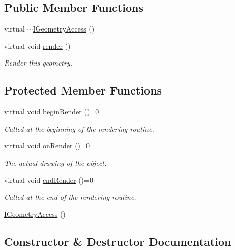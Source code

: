 \subsection*{Public Member Functions}
\begin{DoxyCompactItemize}
\item 
virtual \mbox{\hyperlink{classec_1_1_i_geometry_access_a786b4a8489f1c7fd6c4c2685fc53e7dc}{$\sim$\+I\+Geometry\+Access}} ()
\item 
virtual void \mbox{\hyperlink{classec_1_1_i_geometry_access_a9b6eaf56646bc2b5aa29385aaba02c7d}{render}} ()
\begin{DoxyCompactList}\small\item\em Render this geometry. \end{DoxyCompactList}\end{DoxyCompactItemize}
\subsection*{Protected Member Functions}
\begin{DoxyCompactItemize}
\item 
virtual void \mbox{\hyperlink{classec_1_1_i_geometry_access_a17a87aca44e2a23a6185e78262e02652}{begin\+Render}} ()=0
\begin{DoxyCompactList}\small\item\em Called at the beginning of the rendering routine. \end{DoxyCompactList}\item 
virtual void \mbox{\hyperlink{classec_1_1_i_geometry_access_a2ee418c9fa4eb266347bae2f0ef8095b}{on\+Render}} ()=0
\begin{DoxyCompactList}\small\item\em The actual drawing of the object. \end{DoxyCompactList}\item 
virtual void \mbox{\hyperlink{classec_1_1_i_geometry_access_a6d3b9c34a8b73aeac26663ef349ce41f}{end\+Render}} ()=0
\begin{DoxyCompactList}\small\item\em Called at the end of the rendering routine. \end{DoxyCompactList}\item 
\mbox{\hyperlink{classec_1_1_i_geometry_access_aaf9faa0f583e89aa0b27db7cecbb7c6e}{I\+Geometry\+Access}} ()
\end{DoxyCompactItemize}


\subsection{Constructor \& Destructor Documentation}
\mbox{\label{classec_1_1_i_geometry_access_a786b4a8489f1c7fd6c4c2685fc53e7dc}} 
